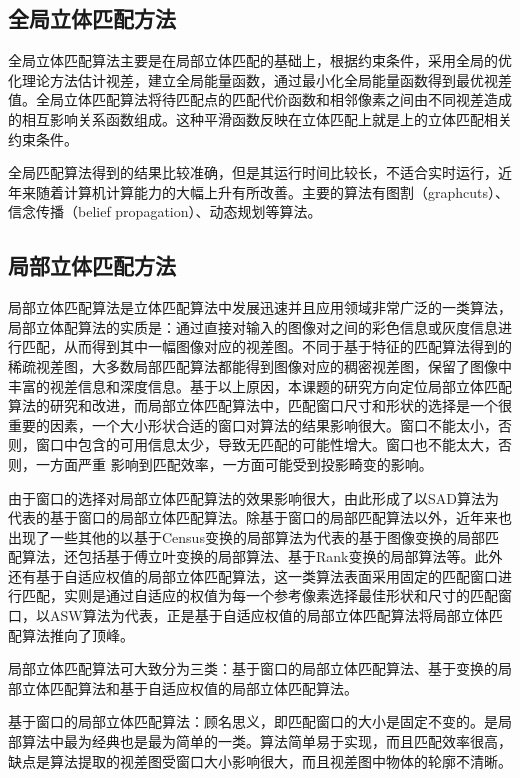 \subsection{全局立体匹配方法}
全局立体匹配算法主要是在局部立体匹配的基础上，根据约束条件，采用全局的优化理论方法估计视差，建立全局能量函数，通过最小化全局能量函数得到最优视差值。全局立体匹配算法将待匹配点的匹配代价函数和相邻像素之间由不同视差造成的相互影响关系函数组成。这种平滑函数反映在立体匹配上就是上的立体匹配相关约束条件。

全局匹配算法得到的结果比较准确，但是其运行时间比较长，不适合实时运行，近年来随着计算机计算能力的大幅上升有所改善。主要的算法有图割（graphcuts）、信念传播（belief propagation）、动态规划等算法。

\subsection{局部立体匹配方法}
局部立体匹配算法是立体匹配算法中发展迅速并且应用领域非常广泛的一类算法，局部立体配算法的实质是：通过直接对输入的图像对之间的彩色信息或灰度信息进行匹配，从而得到其中一幅图像对应的视差图。不同于基于特征的匹配算法得到的稀疏视差图，大多数局部匹配算法都能得到图像对应的稠密视差图，保留了图像中丰富的视差信息和深度信息。基于以上原因，本课题的研究方向定位局部立体匹配算法的研究和改进，而局部立体匹配算法中，匹配窗口尺寸和形状的选择是一个很重要的因素，一个大小形状合适的窗口对算法的结果影响很大。窗口不能太小，否则，窗口中包含的可用信息太少，导致无匹配的可能性增大。窗口也不能太大，否则，一方面严重
影响到匹配效率，一方面可能受到投影畸变的影响。

由于窗口的选择对局部立体匹配算法的效果影响很大，由此形成了以SAD算法为代表的基于窗口的局部立体匹配算法。除基于窗口的局部匹配算法以外，近年来也出现了一些其他的以基于Census变换的局部算法为代表的基于图像变换的局部匹配算法，还包括基于傅立叶变换的局部算法、基于Rank变换的局部算法等。此外还有基于自适应权值的局部立体匹配算法，这一类算法表面采用固定的匹配窗口进行匹配，实则是通过自适应的权值为每一个参考像素选择最佳形状和尺寸的匹配窗口，以ASW算法为代表，正是基于自适应权值的局部立体匹配算法将局部立体匹配算法推向了顶峰。

局部立体匹配算法可大致分为三类：基于窗口的局部立体匹配算法、基于变换的局部立体匹配算法和基于自适应权值的局部立体匹配算法。 

基于窗口的局部立体匹配算法：顾名思义，即匹配窗口的大小是固定不变的。是局部算法中最为经典也是最为简单的一类。算法简单易于实现，而且匹配效率很高，缺点是算法提取的视差图受窗口大小影响很大，而且视差图中物体的轮廓不清晰。

